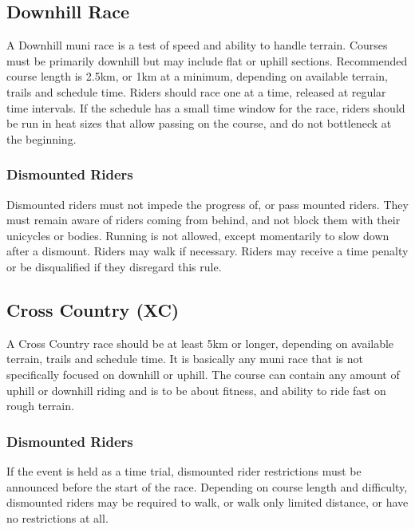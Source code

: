 \subsection{Downhill Race}
A Downhill muni race is a test of speed and ability to handle terrain. Courses
must be primarily downhill but may include flat or uphill sections. Recommended
course length is 2.5km, or 1km at a minimum, depending on available terrain,
trails and schedule time. Riders should race one at a time, released at regular
time intervals. If the schedule has a small time window for the race, riders
should be run in heat sizes that allow passing on the course, and do not
bottleneck at the beginning.

\subsubsection{Dismounted Riders}
Dismounted riders must not impede the progress of, or pass mounted riders. They
must remain aware of riders coming from behind, and not block them with their
unicycles or bodies. Running is not allowed, except momentarily to slow down
after a dismount. Riders may walk if necessary. Riders may receive a time
penalty or be disqualified if they disregard this rule.

\subsection{Cross Country (XC)}
A Cross Country race should be at least 5km or longer, depending on available
terrain, trails and schedule time. It is basically any muni race that is not
specifically focused on downhill or uphill. The course can contain any amount of
uphill or downhill riding and is to be about fitness, and ability to ride fast
on rough terrain.

\subsubsection{Dismounted Riders}
If the event is held as a time trial, dismounted rider restrictions must be
announced before the start of the race. Depending on course length and
difficulty, dismounted riders may be required to walk, or walk only limited
distance, or have no restrictions at all.

